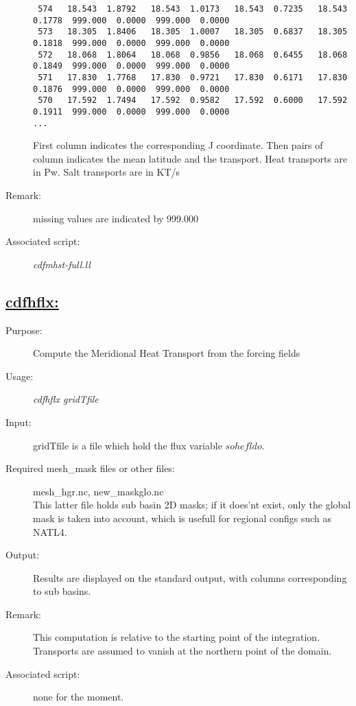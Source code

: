 \documentclass[a4paper,11pt]{article}
\begin{document}
\begin{description}
\begin{scriptsize}
\begin{verbatim}
 574   18.543  1.8792   18.543  1.0173   18.543  0.7235   18.543  0.1778  999.000  0.0000  999.000  0.0000
 573   18.305  1.8406   18.305  1.0007   18.305  0.6837   18.305  0.1818  999.000  0.0000  999.000  0.0000
 572   18.068  1.8064   18.068  0.9856   18.068  0.6455   18.068  0.1849  999.000  0.0000  999.000  0.0000
 571   17.830  1.7768   17.830  0.9721   17.830  0.6171   17.830  0.1876  999.000  0.0000  999.000  0.0000
 570   17.592  1.7494   17.592  0.9582   17.592  0.6000   17.592  0.1911  999.000  0.0000  999.000  0.0000
...
\end{verbatim}
\end{scriptsize}
First column indicates the corresponding J coordinate. Then pairs of column indicates the mean latitude and
the transport. Heat transports are in Pw. Salt transports are in KT/s

\item[Remark:]  missing values are indicated by 999.000
\item[Associated script:] {\em cdfmhst-full.ll} 
\end{description}

\newpage
\subsection*{\underline{cdfhflx:}}
\begin{description}
\item[Purpose:] Compute the Meridional Heat Transport from the forcing fields
\item[Usage:] {\em cdfhflx gridTfile }
\item[Input:] gridTfile is a file which hold the flux variable $sohefldo$.
\item[Required mesh\_mask files or other files:]   mesh\_hgr.nc,  new\_maskglo.nc \\
This latter file holds sub basin 2D  masks; if it does'nt exist, only the global mask is taken into account, which is usefull for regional configs such as NATL4.
\item[Output:] Results are displayed on the standard output, with columns corresponding to sub basins.
\item[Remark:]  This computation is relative to the starting point of the integration. Transports are
assumed to vanish at the northern point of the domain.
\item[Associated script:] none for the moment.
\end{description}
\end{document}
